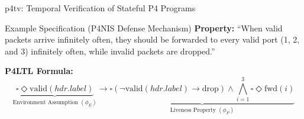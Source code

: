 \documentclass[aspectratio=169]{beamer}
\begin{document}
\begin{hidden}
\begin{frame}{p4tv: Temporal Verification of Stateful P4 Programs}


\begin{block}{Example Specification (P4NIS Defense Mechanism)}
  \textbf{Property:} ``When valid packets arrive infinitely often, they should be forwarded to every valid port (1, 2, and 3) infinitely often, while invalid packets are dropped.''
  \vspace{0.5em}





  \textbf{P4LTL Formula:} 
  \[
      \underbrace{\square\Diamond \text{valid}(hdr.label)}_{\text{Environment Assumption } (\phi_E)} 
      \longrightarrow 
      \underbrace{\square(\neg\text{valid}(hdr.label) \rightarrow \text{drop}) \land \bigwedge_{i=1}^{3} \square\Diamond \text{fwd}(i)}_{\text{Liveness Property } (\phi_P)}
  \]
\end{block}

\end{frame}



\end{hidden}
\end{document}
